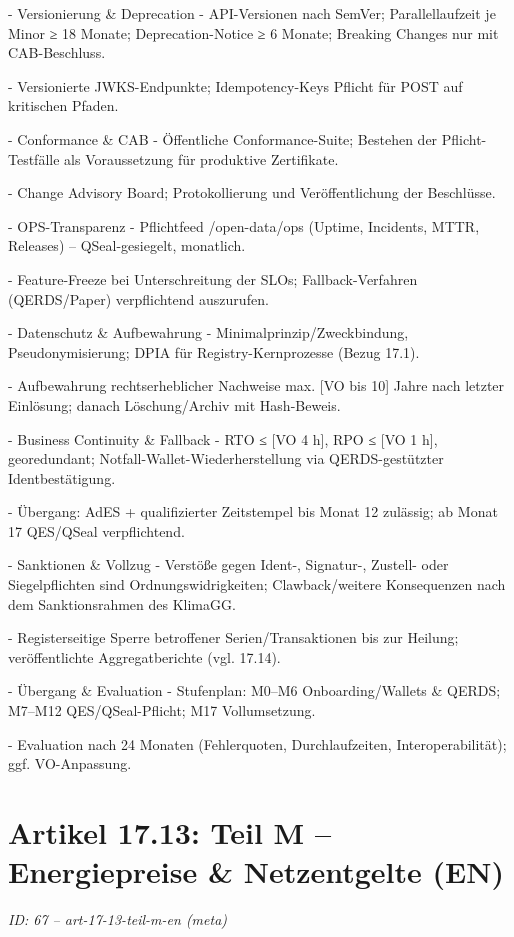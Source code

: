 \documentclass[12pt,a4paper]{scrartcl}
\begin{document}
- Versionierung \& Deprecation
- API-Versionen nach SemVer; Parallellaufzeit je Minor ≥ 18 Monate; Deprecation-Notice ≥ 6 Monate; Breaking Changes nur mit CAB-Beschluss.

- Versionierte JWKS-Endpunkte; Idempotency-Keys Pflicht für POST auf kritischen Pfaden.

- Conformance \& CAB
- Öffentliche Conformance-Suite; Bestehen der Pflicht-Testfälle als Voraussetzung für produktive Zertifikate.

- Change Advisory Board; Protokollierung und Veröffentlichung der Beschlüsse.

- OPS-Transparenz
- Pflichtfeed /open-data/ops (Uptime, Incidents, MTTR, Releases) -- QSeal-gesiegelt, monatlich.

- Feature-Freeze bei Unterschreitung der SLOs; Fallback-Verfahren (QERDS/Paper) verpflichtend auszurufen.

- Datenschutz \& Aufbewahrung
- Minimalprinzip/Zweckbindung, Pseudonymisierung; DPIA für Registry-Kernprozesse (Bezug 17.1).

- Aufbewahrung rechtserheblicher Nachweise max. [VO bis 10] Jahre nach letzter Einlösung; danach Löschung/Archiv mit Hash-Beweis.

- Business Continuity \& Fallback
- RTO ≤ [VO 4 h], RPO ≤ [VO 1 h], georedundant; Notfall-Wallet-Wiederherstellung via QERDS-gestützter Identbestätigung.

- Übergang: AdES + qualifizierter Zeitstempel bis Monat 12 zulässig; ab Monat 17 QES/QSeal verpflichtend.

- Sanktionen \& Vollzug
- Verstöße gegen Ident-, Signatur-, Zustell- oder Siegelpflichten sind Ordnungswidrigkeiten; Clawback/weitere Konsequenzen nach dem Sanktionsrahmen des KlimaGG.

- Registerseitige Sperre betroffener Serien/Transaktionen bis zur Heilung; veröffentlichte Aggregatberichte (vgl. 17.14).

- Übergang \& Evaluation
- Stufenplan: M0--M6 Onboarding/Wallets \& QERDS; M7--M12 QES/QSeal-Pflicht; M17 Vollumsetzung.

- Evaluation nach 24 Monaten (Fehlerquoten, Durchlaufzeiten, Interoperabilität); ggf. VO-Anpassung.


\section[Artikel 17.13: Teil M -- Energiepreise \& Netzentgelte (EN)]{Artikel 17.13: Teil M -- Energiepreise \& Netzentgelte (EN)}
\noindent\textit{ID: 67 -- art-17-13-teil-m-en (meta)}
\end{document}
